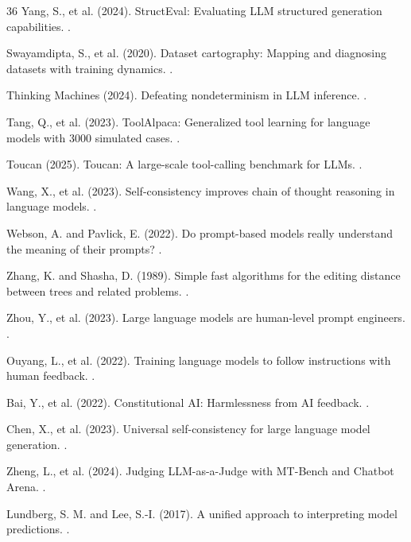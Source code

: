 \documentclass[sigconf,anonymous,review]{acmart}
\begin{document}
\begin{thebibliography}{36}
Yang, S., et al. (2024).
\newblock StructEval: Evaluating LLM structured generation capabilities.
.

Swayamdipta, S., et al. (2020).
\newblock Dataset cartography: Mapping and diagnosing datasets with training dynamics.
.

Thinking Machines (2024).
\newblock Defeating nondeterminism in LLM inference.
.

Tang, Q., et al. (2023).
\newblock ToolAlpaca: Generalized tool learning for language models with 3000 simulated cases.
.

Toucan (2025).
\newblock Toucan: A large-scale tool-calling benchmark for LLMs.
.

Wang, X., et al. (2023).
\newblock Self-consistency improves chain of thought reasoning in language models.
.

Webson, A. and Pavlick, E. (2022).
\newblock Do prompt-based models really understand the meaning of their prompts?
.

Zhang, K. and Shasha, D. (1989).
\newblock Simple fast algorithms for the editing distance between trees and related problems.
.

Zhou, Y., et al. (2023).
\newblock Large language models are human-level prompt engineers.
.

Ouyang, L., et al. (2022).
\newblock Training language models to follow instructions with human feedback.
.

Bai, Y., et al. (2022).
\newblock Constitutional AI: Harmlessness from AI feedback.
.

Chen, X., et al. (2023).
\newblock Universal self-consistency for large language model generation.
.

Zheng, L., et al. (2024).
\newblock Judging LLM-as-a-Judge with MT-Bench and Chatbot Arena.
.

Lundberg, S. M. and Lee, S.-I. (2017).
\newblock A unified approach to interpreting model predictions.
.

\end{thebibliography}
\end{document}
